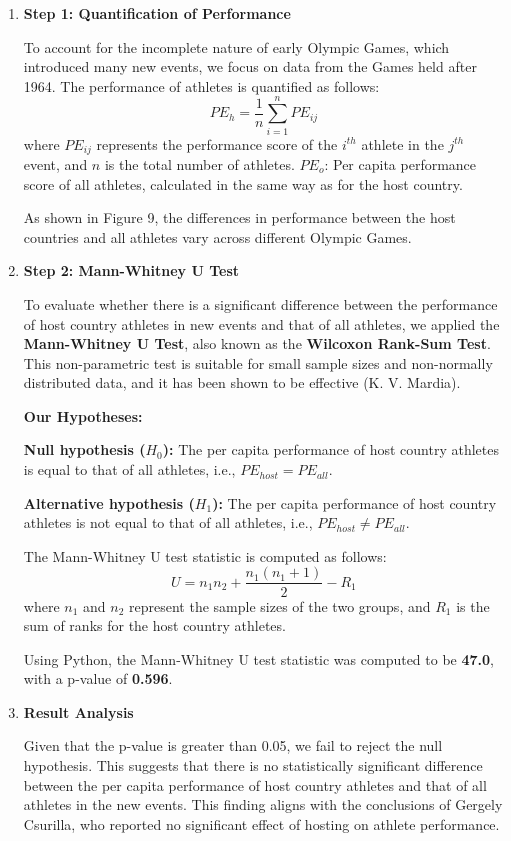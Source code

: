 \documentclass[12pt]{article}  %
\begin{document}
\begin{enumerate}[\textbullet]
    \item \textbf{Step 1: Quantification of Performance}
    
    To account for the incomplete nature of early Olympic Games, which introduced many new events, we focus on data from the Games held after 1964. The performance of athletes is quantified as follows:
    \[
    PE_h = \frac{1}{n} \sum_{i=1}^{n} PE_{ij} \tag{27}
    \]
    where \( PE_{ij} \) represents the performance score of the $i^{th}$ athlete in the $j^{th}$ event, and \( n \) is the total number of athletes.
    $PE_o$: Per capita performance score of all athletes, calculated in the same way as for the host country.

    As shown in Figure 9, the differences in performance between the host countries and all athletes vary across different Olympic Games.

    \item \textbf{Step 2: Mann-Whitney U Test}

    To evaluate whether there is a significant difference between the performance of host country athletes in new events and that of all athletes, we applied the \textbf{Mann-Whitney U Test}, also known as the \textbf{Wilcoxon Rank-Sum Test}\cite{11}. This non-parametric test is suitable for small sample sizes and non-normally distributed data, and it has been shown to be effective (K. V. Mardia)\cite{12}.

    \textbf{Our Hypotheses:}
    
    \textbf{Null hypothesis ($H_0$):} The per capita performance of host country athletes is equal to that of all athletes, i.e., \(PE_{host} = PE_{all}\).
    
    \textbf{Alternative hypothesis ($H_1$):} The per capita performance of host country athletes is not equal to that of all athletes, i.e., \(PE_{host} \neq PE_{all}\).
    
    The Mann-Whitney U test statistic is computed as follows:
    \[
    U = n_1n_2 + \frac{n_1(n_1+1)}{2} - R_1 \tag{28}
    \]
    where \(n_1\) and \(n_2\) represent the sample sizes of the two groups, and \(R_1\) is the sum of ranks for the host country athletes.

    Using Python, the Mann-Whitney U test statistic was computed to be \textbf{47.0}, with a p-value of \textbf{0.596}.

    \item \textbf{Result Analysis}
    
    Given that the p-value is greater than 0.05, we fail to reject the null hypothesis. This suggests that there is no statistically significant difference between the per capita performance of host country athletes and that of all athletes in the new events. This finding aligns with the conclusions of Gergely Csurilla, who reported no significant effect of hosting on athlete performance\cite{13}.
\end{enumerate}
\end{document}
